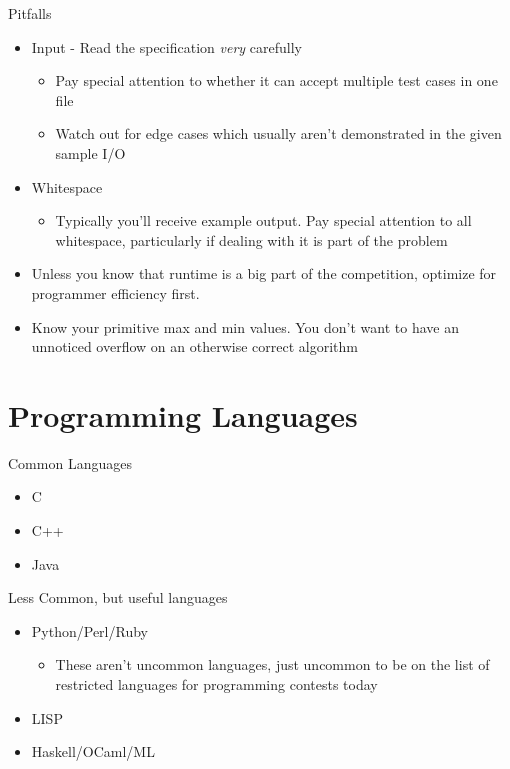 \documentclass{beamer}
\begin{document}
\begin{frame}{Pitfalls}
  \begin{centering}
    \begin{itemize}
      \item Input - Read the specification \textit{very} carefully
      \begin{itemize}
        \item Pay special attention to whether it can accept multiple test cases in one file
        \item Watch out for edge cases which usually aren't demonstrated in the given sample I/O
      \end{itemize}
      \item Whitespace
      \begin{itemize}
        \item Typically you'll receive example output. Pay special attention to all whitespace, particularly if dealing with it is part of the problem
      \end{itemize}

      \item Unless you know that runtime is a big part of the competition, optimize for programmer efficiency first.
      \item Know your primitive max and min values. You don't want to have an unnoticed overflow on an otherwise correct algorithm 
    \end{itemize}
  \end{centering}
\end{frame}

\section{Programming Languages}

\begin{frame}{Common Languages}
  \begin{centering}
    \begin{itemize}
     \item C
     \item C++
     \item Java
    \end{itemize}
  \end{centering}
\end{frame}

\begin{frame}{Less Common, but useful languages}
  \begin{centering}
    \begin{itemize}
      \item Python/Perl/Ruby
      \begin{itemize}
        \item These aren't uncommon languages, just uncommon to be on the list of restricted languages for programming contests today
      \end{itemize}
      \item LISP
      \item Haskell/OCaml/ML
    \end{itemize}
  \end{centering}
\end{frame}
\end{document}
